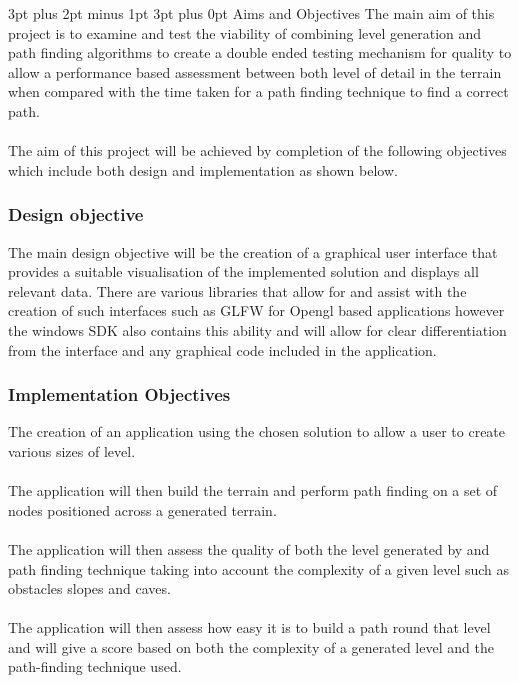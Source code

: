 \documentclass[12pt,a4paper]{article}
\makeatletter
\renewcommand\subsection{\@startsection {subsection}{1}{2mm} %
                               {3pt plus 2pt minus 1pt} %
                               {3pt plus 0pt} %
                               {\normalfont\bfseries}}
\makeatother
\begin{document}
\subsection{Aims and Objectives}
\label{Aims}
The main aim of this project is to examine and test the viability of combining level generation and path finding algorithms to create a double ended testing mechanism for quality to allow a performance based assessment between both level of detail in the terrain when compared with the time taken for a path finding technique to find a correct path.\\\\
   The aim of this project will be achieved by completion of the following objectives which include both design and implementation as shown below.
   
   \subsubsection{Design objective}
   The main design objective will be the creation of a graphical user interface that provides a suitable visualisation of the implemented solution and displays all relevant data. There are various libraries that allow for and assist with the creation of such interfaces such as GLFW for Opengl based applications however the windows SDK also contains this ability and will allow for clear differentiation from the interface and any graphical code included in the application.  
   
   \subsubsection{Implementation Objectives}
    The creation of an application using the chosen solution to allow a user to create various sizes of level.\\\\ The application will then build the terrain and perform path finding on a set of nodes positioned across a generated terrain.\\\\ The application will then assess the quality of both the level generated by  and path finding technique taking into account the complexity of a given level such as obstacles slopes and caves.\\\\The application will then assess how easy it is to build a path round that level and will give a score based on both the complexity of a generated level and the path-finding technique used.\\ 
\end{document}
